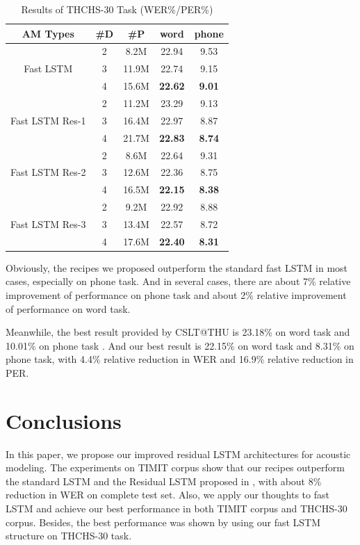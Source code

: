 \documentclass[a4paper]{article}
\begin{document}
\begin{table}
\caption{Results of THCHS-30 Task (WER\%/PER\%)}
\centering
\begin{tabular}{c|c|c|c|c}
\hline
\textbf{AM Types} & \textbf{\#D} & \textbf{\#P} & \textbf{word} & \textbf{phone} \\ \hline \hline
\multirow{3}{2.4cm}{\centering Fast LSTM     } &2 & 8.2M &22.94 &9.53 \\
  &3 &11.9M &22.74 &9.15 \\
  &4 &15.6M &\textbf{22.62} &\textbf{9.01} \\ \hline
\multirow{3}{2.4cm}{\centering Fast LSTM Res-1} &2 &11.2M &23.29 &9.13 \\
  &3 &16.4M &22.97 &8.87 \\
  &4 &21.7M &\textbf{22.83} &\textbf{8.74} \\ \hline
\multirow{3}{2.4cm}{\centering Fast LSTM Res-2} &2 & 8.6M &22.64 &9.31 \\
  &3 &12.6M &22.36 &8.75 \\
  &4 &16.5M &\textbf{22.15} &\textbf{8.38} \\ \hline
\multirow{3}{2.4cm}{\centering Fast LSTM Res-3} &2 & 9.2M &22.92 &8.88 \\
  &3 &13.4M &22.57 &8.72\\
  &4 &17.6M &\textbf{22.40} &\textbf{8.31} \\ \hline
\end{tabular}
\end{table}

Obviously, the recipes we proposed outperform the standard fast LSTM in most cases, especially on phone task.
And in several cases, there are about 7\% relative improvement of performance on phone task and about 2\% relative improvement of performance on word task.

Meanwhile, the best result provided by CSLT@THU is 23.18\% on word task and 10.01\% on phone task \cite{thchs-ch}.
And our best result is 22.15\% on word task and 8.31\% on phone task, with 4.4\% relative reduction in WER and 16.9\% relative reduction in PER.


\section{Conclusions}
In this paper, we propose our improved residual LSTM architectures for acoustic modeling.
The experiments on TIMIT corpus show that our recipes outperform the standard LSTM and the Residual LSTM proposed in \cite{residual-lstm},
with about 8\% reduction in WER on complete test set.
Also, we apply our thoughts to fast LSTM and achieve our best performance in both TIMIT corpus and THCHS-30 corpus.
Besides, the best performance was shown by using our fast LSTM structure on THCHS-30 task.
\end{document}
